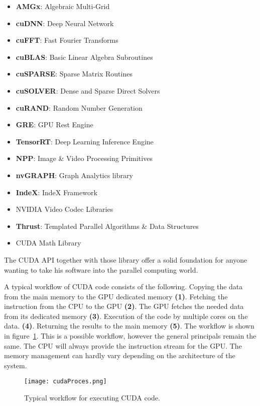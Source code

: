 \begin{itemize}
	\item \textbf{AMGx}: Algebraic Multi-Grid
	\item \textbf{cuDNN}: Deep Neural Network
	\item \textbf{cuFFT}: Fast Fourier Transforms
	\item \textbf{cuBLAS}: Basic Linear Algebra Subroutines
	\item \textbf{cuSPARSE}: Sparse Matrix Routines
	\item \textbf{cuSOLVER}: Dense and Sparse Direct Solvers
	\item \textbf{cuRAND}: Random Number Generation
	\item \textbf{GRE}: GPU Rest Engine
	\item \textbf{TensorRT}: Deep Learning Inference Engine
	\item \textbf{NPP}: Image \& Video Processing Primitives
	\item \textbf{nvGRAPH}: Graph Analytics library
	\item \textbf{IndeX}: IndeX Framework 
	\item NVIDIA Video Codec Libraries
	\item \textbf{Thrust}: Templated Parallel Algorithms \& Data Structures
	\item CUDA Math Library
\end{itemize}
The CUDA API together with those library offer a solid foundation for anyone wanting to take his software into the parallel computing world.
\par
A typical workflow of CUDA code consists of the following.
Copying the data from the main memory to the GPU dedicated memory \textbf{(1)}. 
Fetching the instruction from  the CPU to the GPU \textbf{(2)}.
The GPU fetches the needed data from its dedicated memory \textbf{(3)}.
Execution of the code by multiple cores on the data. \textbf{(4)}.
Returning the results to the main memory \textbf{(5)}.
The workflow is shown in figure~\ref{fig:cudaproc}.
This is a possible workflow, however the general principals remain the same.
The CPU will always provide the instruction stream for the GPU.
The memory management can hardly vary depending on the architecture of the system.
\begin{figure}
	\centering
	\texttt{[image: cudaProces.png]}
	\caption{Typical workflow for executing CUDA code.}
	\label{fig:cudaproc}
\end{figure}
